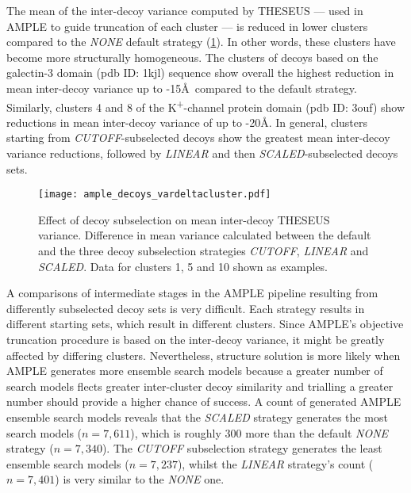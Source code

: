 The mean of the inter-decoy variance computed by THESEUS --- used in AMPLE to guide truncation of each cluster --- is reduced in lower clusters compared to the \textit{NONE} default strategy (\cref{fig:ample_decoys_vardeltacluster}). In other words, these clusters have become more structurally homogeneous. The clusters of decoys based on the galectin-3 domain (\gls{pdb} ID: 1kjl) sequence show overall the highest reduction in mean inter-decoy variance up to -15\AA\ compared to the default strategy. Similarly, clusters 4 and 8 of the K\textsuperscript{+}-channel protein domain (\gls{pdb} ID: 3ouf) show reductions in mean inter-decoy variance of up to -20\AA. In general, clusters starting from \textit{CUTOFF}-subselected decoys show the greatest mean inter-decoy variance reductions, followed by \textit{LINEAR} and then \textit{SCALED}-subselected decoys sets.

\begin{figure}[H]
    \centering
    \texttt{[image: ample\_decoys\_vardeltacluster.pdf]}
    \caption[Effect of decoy subselection on THESEUS variance]{Effect of decoy subselection on mean inter-decoy THESEUS variance. Difference in mean variance calculated between the default and the three decoy subselection strategies \textit{CUTOFF}, \textit{LINEAR} and \textit{SCALED}. Data for clusters 1, 5 and 10 shown as examples.}
    \label{fig:ample_decoys_vardeltacluster}
\end{figure}

A comparisons of intermediate stages in the AMPLE pipeline resulting from differently subselected decoy sets is very difficult. Each strategy results in different starting sets, which result in different clusters. Since AMPLE's objective truncation procedure is based on the inter-decoy variance, it might be greatly affected by differing clusters. Nevertheless, structure solution is more likely when AMPLE generates more ensemble search models because a greater number of search models flects greater inter-cluster decoy similarity and trialling a greater number should provide a higher chance of success. A count of generated AMPLE ensemble search models reveals that the \textit{SCALED} strategy generates the most search models ($n=7,611$), which is roughly 300 more than the default \textit{NONE} strategy ($n=7,340$). The \textit{CUTOFF} subselection strategy generates the least ensemble search models ($n=7,237$), whilst the \textit{LINEAR} strategy's count ($n=7,401$) is very similar to the \textit{NONE} one.

